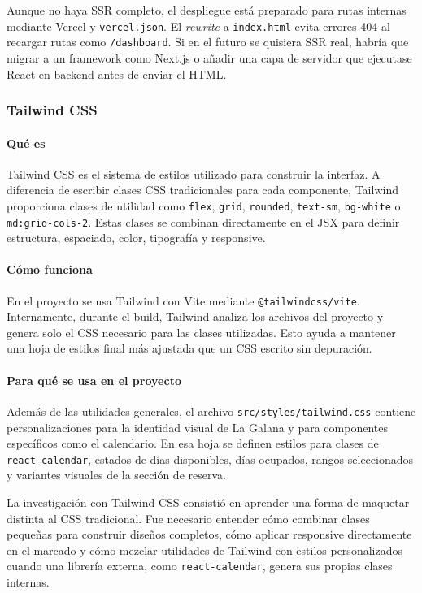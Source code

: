 \documentclass[11pt,a4paper]{article}
\begin{document}
Aunque no haya SSR completo, el despliegue está preparado para rutas internas mediante Vercel y \texttt{vercel.json}. El \textit{rewrite} a \texttt{index.html} evita errores 404 al recargar rutas como \texttt{/dashboard}. Si en el futuro se quisiera SSR real, habría que migrar a un framework como Next.js o añadir una capa de servidor que ejecutase React en backend antes de enviar el HTML.

\subsubsection{Tailwind CSS}
\paragraph{Qué es}
Tailwind CSS es el sistema de estilos utilizado para construir la interfaz. A diferencia de escribir clases CSS tradicionales para cada componente, Tailwind proporciona clases de utilidad como \texttt{flex}, \texttt{grid}, \texttt{rounded}, \texttt{text-sm}, \texttt{bg-white} o \texttt{md:grid-cols-2}. Estas clases se combinan directamente en el JSX para definir estructura, espaciado, color, tipografía y responsive.

\paragraph{Cómo funciona}
En el proyecto se usa Tailwind con Vite mediante \texttt{@tailwindcss/vite}. Internamente, durante el build, Tailwind analiza los archivos del proyecto y genera solo el CSS necesario para las clases utilizadas. Esto ayuda a mantener una hoja de estilos final más ajustada que un CSS escrito sin depuración.

\paragraph{Para qué se usa en el proyecto}
Además de las utilidades generales, el archivo \texttt{src/styles/tailwind.css} contiene personalizaciones para la identidad visual de La Galana y para componentes específicos como el calendario. En esa hoja se definen estilos para clases de \texttt{react-calendar}, estados de días disponibles, días ocupados, rangos seleccionados y variantes visuales de la sección de reserva.

La investigación con Tailwind CSS consistió en aprender una forma de maquetar distinta al CSS tradicional. Fue necesario entender cómo combinar clases pequeñas para construir diseños completos, cómo aplicar responsive directamente en el marcado y cómo mezclar utilidades de Tailwind con estilos personalizados cuando una librería externa, como \texttt{react-calendar}, genera sus propias clases internas.
\end{document}
